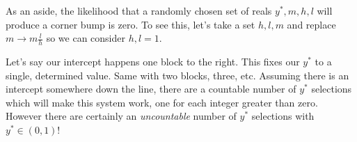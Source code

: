 \documentclass[11pt, oneside]{article} 	%
\begin{document}
As an aside, the likelihood that a randomly chosen set of reals $y^*, m, h, l$ will produce a corner bump is zero.  To see this, let's take a set $h, l, m$ and replace $m \rightarrow m \frac{l}{h}$ so we can consider $h, l = 1$. 

Let's say our intercept happens one block to the right. This fixes our $y^*$ to a single, determined value. Same with two blocks, three, etc. Assuming there is an intercept somewhere down the line, there are a countable number of $y^*$ selections which will make this system work, one for each integer greater than zero. However there are certainly an \emph{uncountable} number of $y^*$ selections with $y^* \in (0, 1)$!
\end{document}

